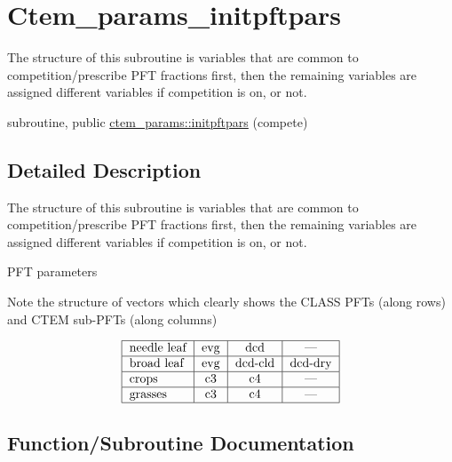 \hypertarget{group__ctem__params__initpftpars}{}\section{Ctem\+\_\+params\+\_\+initpftpars}
\label{group__ctem__params__initpftpars}


The structure of this subroutine is variables that are common to competition/prescribe P\+F\+T fractions first, then the remaining variables are assigned different variables if competition is on, or not.  


\begin{DoxyCompactItemize}
\item 
subroutine, public \hyperlink{group__ctem__params__initpftpars_ga766b01bfb91b339c953fe72266c10aaf}{ctem\+\_\+params\+::initpftpars} (compete)
\end{DoxyCompactItemize}


\subsection{Detailed Description}
The structure of this subroutine is variables that are common to competition/prescribe P\+F\+T fractions first, then the remaining variables are assigned different variables if competition is on, or not. 

P\+F\+T parameters

Note the structure of vectors which clearly shows the C\+L\+A\+S\+S P\+F\+Ts (along rows) and C\+T\+E\+M sub-\/\+P\+F\+Ts (along columns)

\[ \begin{tabular} { | l | c | c | c | } \hline needle leaf & evg & dcd & --- \\ \hline broad leaf & evg & dcd-cld & dcd-dry \\ \hline crops & c3 & c4 & --- \\ \hline grasses & c3 & c4 & --- \\ \hline \end{tabular} \] 

\subsection{Function/\+Subroutine Documentation}
\hypertarget{group__ctem__params__initpftpars_ga766b01bfb91b339c953fe72266c10aaf}{}
